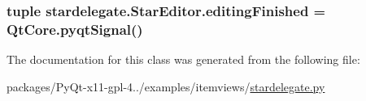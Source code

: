 \subsubsection[{editing\+Finished}]{\setlength{\rightskip}{0pt plus 5cm}tuple stardelegate.\+Star\+Editor.\+editing\+Finished = Qt\+Core.\+pyqt\+Signal()\hspace{0.3cm}{\ttfamily [static]}}\label{classstardelegate_1_1StarEditor_a0769a1dda5bcfe0ceccded7f2ab66a4d}


The documentation for this class was generated from the following file\+:\begin{DoxyCompactItemize}
\item 
packages/\+Py\+Qt-\/x11-\/gpl-\/4../examples/itemviews/\hyperlink{stardelegate_8py}{stardelegate.\+py}\end{DoxyCompactItemize}

